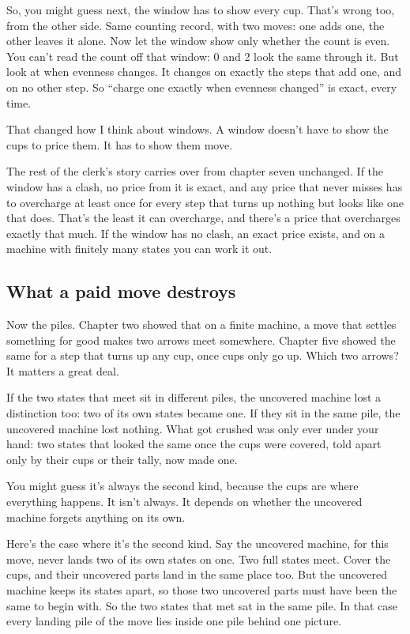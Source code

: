 \documentclass[11pt,twoside]{article}
\theoremstyle{thielethm}
\theoremstyle{thieledef}
\theoremstyle{thieledef}
\theoremstyle{thieledef}
\theoremstyle{thielethm}
\theoremstyle{thieleobs}
\theoremstyle{thielethm}
\begin{document}
So, you might guess next, the window has to show every cup. That's wrong too, from the other side. Same counting record, with two moves: one adds one, the other leaves it alone. Now let the window show only whether the count is even. You can't read the count off that window: 0 and 2 look the same through it. But look at when evenness changes. It changes on exactly the steps that add one, and on no other step. So ``charge one exactly when evenness changed'' is exact, every time.

That changed how I think about windows. A window doesn't have to show the cups to price them. It has to show them move.

The rest of the clerk's story carries over from chapter seven unchanged. If the window has a clash, no price from it is exact, and any price that never misses has to overcharge at least once for every step that turns up nothing but looks like one that does. That's the least it can overcharge, and there's a price that overcharges exactly that much. If the window has no clash, an exact price exists, and on a machine with finitely many states you can work it out.

\subsection{What a paid move destroys}

Now the piles. Chapter two showed that on a finite machine, a move that settles something for good makes two arrows meet somewhere. Chapter five showed the same for a step that turns up any cup, once cups only go up. Which two arrows? It matters a great deal.

If the two states that meet sit in different piles, the uncovered machine lost a distinction too: two of its own states became one. If they sit in the same pile, the uncovered machine lost nothing. What got crushed was only ever under your hand: two states that looked the same once the cups were covered, told apart only by their cups or their tally, now made one.

You might guess it's always the second kind, because the cups are where everything happens. It isn't always. It depends on whether the uncovered machine forgets anything on its own.

Here's the case where it's the second kind. Say the uncovered machine, for this move, never lands two of its own states on one. Two full states meet. Cover the cups, and their uncovered parts land in the same place too. But the uncovered machine keeps its states apart, so those two uncovered parts must have been the same to begin with. So the two states that met sat in the same pile. In that case every landing pile of the move lies inside one pile behind one picture.
\end{document}
